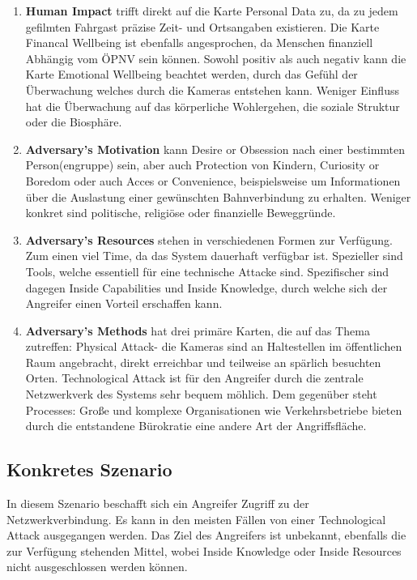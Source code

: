 \begin{enumerate}
      \item {\bfseries Human Impact} trifft direkt auf die Karte \glqq{}Personal Data\grqq{} zu, da zu jedem gefilmten Fahrgast präzise Zeit- und Ortsangaben existieren.
            Die Karte \glqq{}Financal Wellbeing\grqq{} ist ebenfalls angesprochen, da Menschen finanziell Abhängig vom ÖPNV sein können. Sowohl positiv als auch negativ kann die Karte \glqq{}Emotional Wellbeing\grqq{}
            beachtet werden, durch das Gefühl der Überwachung welches durch die Kameras entstehen kann. Weniger Einfluss hat die Überwachung auf das körperliche Wohlergehen, die soziale Struktur oder die Biosphäre.
      \item {\bfseries Adversary's Motivation} kann \glqq{}Desire or Obsession\grqq{} nach einer bestimmten Person(engruppe) sein, aber auch \glqq{}Protection\grqq{} von Kindern, \glqq{}Curiosity or Boredom\grqq{} oder auch \glqq{}Acces or Convenience\grqq{},
            beispielsweise um Informationen über die Auslastung einer gewünschten Bahnverbindung zu erhalten. Weniger konkret sind politische, religiöse oder finanzielle Beweggründe.
      \item {\bfseries Adversary's Resources} stehen in verschiedenen Formen zur Verfügung. Zum einen viel \glqq{}Time\grqq{}, da das System dauerhaft verfügbar ist. Spezieller sind \glqq{}Tools\grqq{}, welche essentiell für eine technische Attacke sind.
            Spezifischer sind dagegen \glqq{}Inside Capabilities\grqq{} und \glqq{}Inside Knowledge\grqq{}, durch welche sich der Angreifer einen Vorteil erschaffen kann.
      \item {\bfseries Adversary's Methods} hat drei primäre Karten, die auf das Thema zutreffen: \glqq{}Physical Attack\grqq{}- die Kameras sind an Haltestellen im öffentlichen Raum angebracht, direkt erreichbar und teilweise an spärlich besuchten Orten.
            \glqq{}Technological Attack\grqq{} ist für den Angreifer durch die zentrale Netzwerkverk des Systems sehr bequem möhlich. Dem gegenüber steht \glqq{}Processes\grqq{}: Große und komplexe Organisationen wie Verkehrsbetriebe bieten durch die entstandene Bürokratie eine andere Art der Angriffsfläche.
\end{enumerate}
\subsection{Konkretes Szenario}
In diesem Szenario beschafft sich ein Angreifer Zugriff zu der Netzwerkverbindung. Es kann in den meisten Fällen von einer \glqq{}Technological Attack\grqq{} ausgegangen werden. Das Ziel des Angreifers ist unbekannt, ebenfalls die zur Verfügung stehenden Mittel,
wobei \glqq{}Inside Knowledge\grqq{} oder \glqq{}Inside Resources\grqq{} nicht ausgeschlossen werden können.

